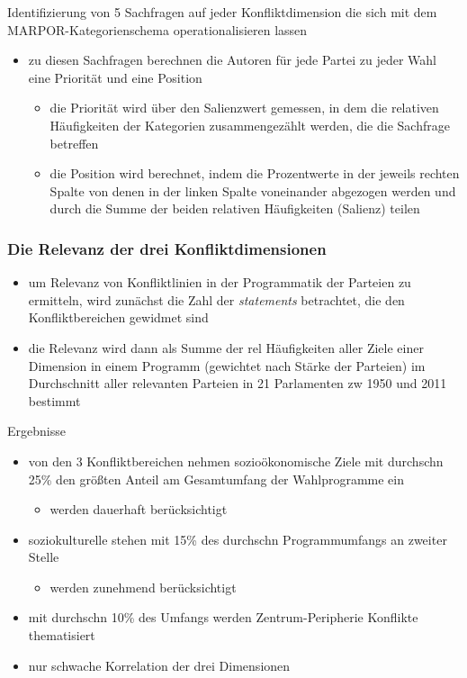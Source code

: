 \documentclass[11pt]{article}
\begin{document}
Identifizierung von 5 Sachfragen auf jeder Konfliktdimension die sich mit dem MARPOR-Kategorienschema operationalisieren lassen
\begin{itemize}
\item zu diesen Sachfragen berechnen die Autoren für jede Partei zu jeder Wahl eine Priorität und eine Position
\begin{itemize}
\item die Priorität wird über den Salienzwert gemessen, in dem die relativen Häufigkeiten der Kategorien zusammengezählt werden, die die Sachfrage betreffen
\item die Position wird berechnet, indem die Prozentwerte in der jeweils rechten Spalte von denen in der linken Spalte voneinander abgezogen werden und durch die Summe der beiden relativen Häufigkeiten (Salienz) teilen
\end{itemize}
\end{itemize}

\subsubsection{Die Relevanz der drei Konfliktdimensionen}
\label{sec:orga793608}
\begin{itemize}
\item um Relevanz von Konfliktlinien in der Programmatik der Parteien zu ermitteln, wird zunächst die Zahl der \emph{statements} betrachtet, die den Konfliktbereichen gewidmet sind
\item die Relevanz wird dann als Summe der rel Häufigkeiten aller Ziele einer Dimension in einem Programm (gewichtet nach Stärke der Parteien) im Durchschnitt aller relevanten Parteien in 21 Parlamenten zw 1950 und 2011 bestimmt
\end{itemize}

Ergebnisse
\begin{itemize}
\item von den 3 Konfliktbereichen nehmen sozioökonomische Ziele mit durchschn 25\% den größten Anteil am Gesamtumfang der Wahlprogramme ein
\begin{itemize}
\item werden dauerhaft berücksichtigt
\end{itemize}
\item soziokulturelle stehen mit 15\% des durchschn Programmumfangs an zweiter Stelle
\begin{itemize}
\item werden zunehmend berücksichtigt
\end{itemize}
\item mit durchschn 10\% des Umfangs werden Zentrum-Peripherie Konflikte thematisiert
\item nur schwache Korrelation der drei Dimensionen
\end{itemize}
\end{document}

